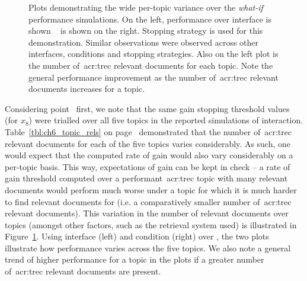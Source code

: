 \begin{figure}[t!]
    \centering
    \caption[Per-topic performance variation example]{Plots demonstrating the wide per-topic variance over the \emph{what-if} performance simulations. On the left, performance over interface  is shown \textemdash~ is shown on the right. Stopping strategy  is used for this demonstration. Similar observations were observed across other interfaces, conditions and stopping strategies. Also  on the left plot is the number of~\gls{acr:trec} relevant documents for each topic. Note the general performance improvement as the number of~\gls{acr:trec} relevant documents increases for a topic.}
    \label{fig:per_topic_differences}
\end{figure}

Considering point~ first, we note that the same gain stopping threshold values (for $x_8$) were trialled over all five topics in the reported simulations of interaction. Table~\ref{tbl:ch6_topic_rels} on page~\pageref{tbl:ch6_topic_rels} demonstrated that the number of~\gls{acr:trec} relevant documents for each of the five topics varies considerably. As such, one would expect that the computed rate of gain would also vary considerably on a per-topic basis. This way, expectations of gain can be kept in check -- a rate of gain threshold computed over a performant~\gls{acr:trec} topic with many relevant documents would perform much worse under a topic for which it is much harder to find relevant documents for (i.e. a comparatively smaller number of~\gls{acr:trec} relevant documents). This variation in the number of relevant documents over topics (amongst other factors, such as the retrieval system used) is illustrated in Figure~\ref{fig:per_topic_differences}. Using interface  (left) and condition  (right) over , the two plots illustrate how performance varies across the five topics. We also note a general trend of higher performance for a topic in the plots if a greater number of~\gls{acr:trec} relevant documents are present.

